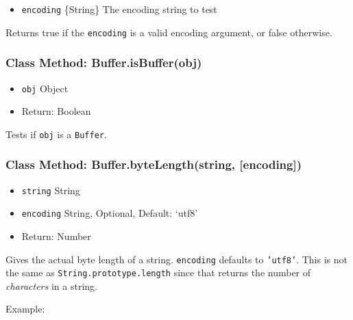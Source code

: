 \begin{itemize}
\itemsep1pt\parskip0pt
\item
  \texttt{encoding} \{String\} The encoding string to test
\end{itemize}

Returns true if the \texttt{encoding} is a valid encoding argument, or
false otherwise.

\subsubsection{Class Method:
Buffer.isBuffer(obj)}\label{class-method-buffer.isbufferobj}

\begin{itemize}
\itemsep1pt\parskip0pt
\item
  \texttt{obj} Object
\item
  Return: Boolean
\end{itemize}

Tests if \texttt{obj} is a \texttt{Buffer}.

\subsubsection{Class Method: Buffer.byteLength(string,
{[}encoding{]})}\label{class-method-buffer.bytelengthstring-encoding}

\begin{itemize}
\itemsep1pt\parskip0pt
\item
  \texttt{string} String
\item
  \texttt{encoding} String, Optional, Default: `utf8'
\item
  Return: Number
\end{itemize}

Gives the actual byte length of a string. \texttt{encoding} defaults to
\texttt{'utf8'}. This is not the same as
\texttt{String.prototype.length} since that returns the number of
\emph{characters} in a string.

Example:

\begin{Shaded}
\begin{Highlighting}[]
\NormalTok{;}

 \NormalTok{+ } \NormalTok{+ } \NormalTok{+}
  \NormalTok{) + }\NormalTok{);}

\end{Highlighting}
\end{Shaded}

